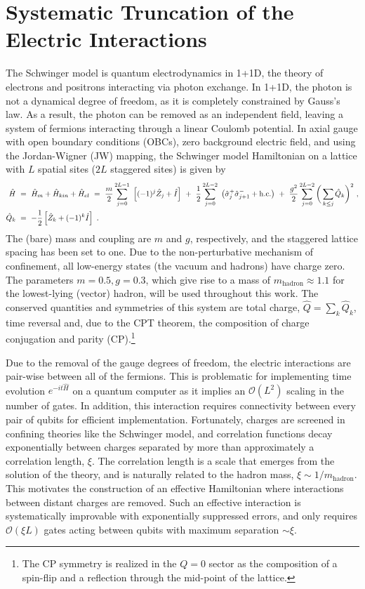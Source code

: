 \documentclass[aps, prc, tightenlines,superscriptaddress, letterpaper, amsmath, amssymb, preprintnumbers, floatfix, longbibliography, nofootinbib]{revtex4-2}
\begin{document}
\section{Systematic Truncation of the Electric Interactions}
\label{sec:HamTruncs}
\noindent
The Schwinger model is quantum electrodynamics in 1+1D, the theory of electrons and positrons interacting via photon exchange.
In 1+1D, the photon is not a dynamical degree of freedom, as it is completely constrained by Gauss's law. 
As a result, the photon can be removed as an independent field, leaving a system of fermions interacting through a linear Coulomb potential.
In axial gauge with open boundary conditions (OBCs), zero background electric field, and using the Jordan-Wigner (JW) mapping, the Schwinger model Hamiltonian on a lattice with $L$ spatial sites ($2L$ staggered sites) is given by~\cite{Kogut:1974ag,Banks:1975gq}
%
\begin{align}
\hat H & \ =\  \hat H_m + \hat H_{kin} + \hat H_{el} \ = \ \frac{m}{ 2}\sum_{j=0}^{2L-1}\ \left[ (-1)^j \hat Z_j + \hat{I} \right] \ + \ \frac{1}{2}\sum_{j=0}^{2L-2}\ \left( \hat \sigma^+_j \hat\sigma^-_{j+1} + {\rm h.c.} \right) \ + \ \frac{g^2}{ 2}\sum_{j=0}^{2L-2}\bigg (\sum_{k\leq j} \hat Q_k \bigg )^2 
\ ,
\nonumber \\ 
\hat Q_k & \ = \ -\frac{1}{2}\left[ \hat Z_k + (-1)^k\hat{I} \right] \ .
\label{eq:Hgf}
\end{align}
%
The (bare) mass and coupling are $m$ and $g$, respectively, and the staggered lattice spacing has been set to one.
Due to the non-perturbative mechanism of confinement, all low-energy states (the vacuum and hadrons) have charge zero. 
The parameters $m=0.5,g=0.3$, which give rise to a mass of $m_{\text{hadron}}\approx1.1$ for the lowest-lying (vector) hadron, will be used throughout this work.
The conserved quantities and symmetries of this system are total charge, $\hat{Q} = \sum_{k} \hat{Q}_k$, time reversal and, due to the CPT theorem, the composition of charge conjugation and parity (CP).\footnote{The CP symmetry is realized in the $Q=0$ sector as the composition of a spin-flip and a reflection through the mid-point of the lattice.}

Due to the removal of the gauge degrees of freedom, the electric interactions are pair-wise between all of the fermions.
This is problematic for implementing time evolution $e^{-i t \hat{H}}$ on a quantum computer as it implies an $\mathcal{O}(L^2)$ scaling in the number of gates.
In addition, this interaction requires connectivity between every pair of qubits for efficient implementation.
Fortunately, charges are screened in  confining theories like the Schwinger model, and correlation functions decay exponentially between charges separated by more than approximately a correlation length, $\xi$.
The correlation length is a scale that emerges from the solution of the theory, and is naturally related to the hadron mass, $\xi \sim 1/m_{\text{hadron}}$.
This motivates the construction of an effective Hamiltonian where interactions between distant charges are removed.
Such an effective interaction is systematically improvable with exponentially suppressed errors, and only requires $\mathcal{O}(\xi L)$ gates acting between qubits with maximum separation $\sim\xi$.
\end{document}
